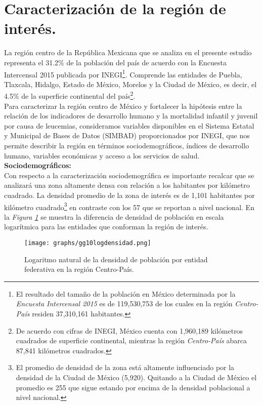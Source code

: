 \documentclass[11pt, oneside]{book}
\begin{document}
\section{Caracterización de la región de interés.}
La región centro de la República Mexicana que se analiza en el presente estudio representa el 31.2\% de la población del país de acuerdo con la Encuesta Intercensal 2015 publicada por INEGI\footnote{El resultado del tamaño de la población en México determinada por la \emph{Encuesta Intercensal 2015} es de 119,530,753 de los cuales en la región \emph{Centro-País} residen 37,310,161 habitantes.}. Comprende las entidades de Puebla, Tlaxcala, Hidalgo, Estado de México, Morelos y la Ciudad de México, es decir, el 4.5\% de la superficie continental del país\footnote{De acuerdo con cifras de INEGI, México cuenta con 1,960,189 kilómetros cuadrados de superficie continental, mientras la región \emph{Centro-País} abarca 87,841 kilómetros cuadrados.}.\\ 

Para caracterizar la región centro de México y fortalecer la hipótesis entre la relación de los indicadores de desarrollo humano y la mortalidad infantil y juvenil por causa de leucemias, consideramos variables disponibles en el Sistema Estatal y Municipal de Bases de Datos (SIMBAD) proporcionados por INEGI, que nos permite describir la región en términos sociodemográficos, índices de desarrollo humano, variables económicas y acceso a los servicios de salud.\\

\noindent \textbf{Sociodemográficos:}\\
\noindent Con respecto a la caracterización sociodemográfica es importante recalcar que se analizará una zona altamente densa con relación a los habitantes por kilómetro cuadrado. La densidad promedio de la zona de interés es de 1,101 habitantes por kilómetro cuadrado\footnote{El promedio de densidad de la zona está altamente influenciado por la densidad de la Ciudad de México (5,920). Quitando a la Ciudad de México el promedio es 255 que sigue estando por encima de la densidad poblacional a nivel nacional.} en contraste con los 57 que se reportan a nivel nacional. En la \emph{Figura \ref{fig.10.densidad}} se muestra la diferencia de densidad de población en escala logarítmica para las entidades que conforman la región de interés.\\

\begin{figure}[ht]
    \centering    
    \texttt{[image: graphs/gg10logdensidad.png]}
  \caption{Logaritmo natural de la densidad de población por entidad federativa en la región Centro-País.}
  \label{fig.10.densidad}
\end{figure}
\end{document}
